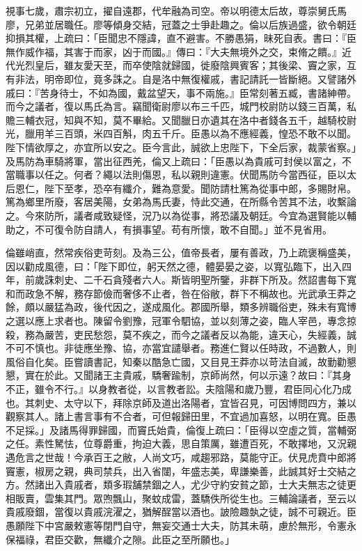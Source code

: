 \begin{pinyinscope}
視事七歲，肅宗初立，擢自遠郡，代牟融為司空。帝以明德太后故，尊崇舅氏馬廖，兄弟並居職任。廖等傾身交結，冠蓋之士爭赴趣之。倫以后族過盛，欲令朝廷抑損其權，上疏曰：「臣聞忠不隱諱，直不避害。不勝愚狷，昧死自表。書曰：『臣無作威作福，其害于而家，凶于而國。』傳曰：『大夫無境外之交，束脩之饋。』近代光烈皇后，雖友愛天至，而卒使陰就歸國，徙廢陰興賓客；其後梁、竇之家，互有非法，明帝即位，竟多誅之。自是洛中無復權戚，書記請託一皆斷絕。又譬諸外戚曰：『苦身待士，不如為國，戴盆望天，事不兩施。』臣常刻著五臧，書諸紳帶。而今之議者，復以馬氏為言。竊聞衛尉廖以布三千匹，城門校尉防以錢三百萬，私贍三輔衣冠，知與不知，莫不畢給。又聞臘日亦遺其在洛中者錢各五千，越騎校尉光，臘用羊三百頭，米四百斛，肉五千斤。臣愚以為不應經義，惶恐不敢不以聞。陛下情欲厚之，亦宜所以安之。臣今言此，誠欲上忠陛下，下全后家，裁蒙省察。」及馬防為車騎將軍，當出征西羌，倫又上疏曰：「臣愚以為貴戚可封侯以富之，不當職事以任之。何者？繩以法則傷恩，私以親則違憲。伏聞馬防今當西征，臣以太后恩仁，陛下至孝，恐卒有纖介，難為意愛。聞防請杜篤為從事中郎，多賜財帛。篤為鄉里所廢，客居美陽，女弟為馬氏妻，恃此交通，在所縣令苦其不法，收繫論之。今來防所，議者咸致疑怪，況乃以為從事，將恐議及朝廷。今宜為選賢能以輔助之，不可復令防自請人，有損事望。苟有所懷，敢不自聞。」並不見省用。

倫雖峭直，然常疾俗吏苛刻。及為三公，值帝長者，屢有善政，乃上疏褒稱盛美，因以勸成風德，曰：「陛下即位，躬天然之德，體晏晏之姿，以寬弘臨下，出入四年，前歲誅刺史、二千石貪殘者六人。斯皆明聖所鑒，非群下所及。然詔書每下寬和而政急不解，務存節儉而奢侈不止者，咎在俗敝，群下不稱故也。光武承王莽之餘，頗以嚴猛為政，後代因之，遂成風化。郡國所舉，類多辨職俗吏，殊未有寬博之選以應上求者也。陳留令劉豫，冠軍令駟協，並以刻薄之姿，臨人宰邑，專念掠殺，務為嚴苦，吏民愁怨，莫不疾之，而今之議者反以為能，違天心，失經義，誠不可不慎也。非徒應坐豫、協，亦當宜譴舉者。務進仁賢以任時政，不過數人，則風俗自化矣。臣嘗讀書記，知秦以酷急亡國，又目見王莽亦以苛法自滅，故勤勸懇懇，實在於此。又聞諸王主貴戚，驕奢踰制，京師尚然，何以示遠？故曰：『其身不正，雖令不行。』以身教者從，以言教者訟。夫陰陽和歲乃豐，君臣同心化乃成也。其刺史、太守以下，拜除京師及道出洛陽者，宜皆召見，可因博問四方，兼以觀察其人。諸上書言事有不合者，可但報歸田里，不宜過加喜怒，以明在寬。臣愚不足採。」及諸馬得罪歸國，而竇氏始貴，倫復上疏曰：「臣得以空虛之質，當輔弼之任。素性駑怯，位尊爵重，拘迫大義，思自策厲，雖遭百死，不敢擇地，又況親遇危言之世哉！今承百王之敝，人尚文巧，咸趨邪路，莫能守正。伏見虎賁中郎將竇憲，椒房之親，典司禁兵，出入省闥，年盛志美，卑謙樂善，此誠其好士交結之方。然諸出入貴戚者，類多瑕舗禁錮之人，尤少守約安貧之節，士大夫無志之徒更相販賣，雲集其門。眾喣飄山，聚蚊成雷，蓋驕佚所從生也。三輔論議者，至云以貴戚廢錮，當復以貴戚浣濯之，猶解酲當以酒也。詖險趣埶之徒，誠不可親近。臣愚願陛下中宮嚴敕憲等閉門自守，無妄交通士大夫，防其未萌，慮於無形，令憲永保福祿，君臣交歡，無纖介之隙。此臣之至所願也。」


\end{pinyinscope}
